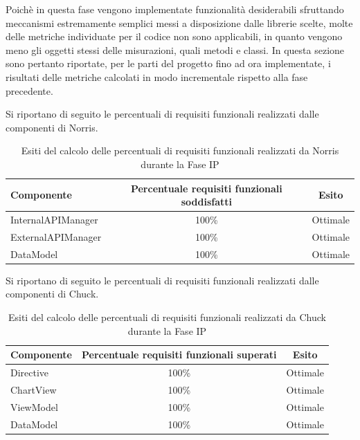 	Poichè in questa fase vengono implementate funzionalità desiderabili sfruttando meccanismi estremamente semplici messi a disposizione dalle librerie scelte, molte delle metriche individuate per il codice non sono applicabili, in quanto vengono meno gli oggetti stessi delle misurazioni, quali metodi e classi.
	In questa sezione sono pertanto riportate, per le parti del progetto fino ad ora implementate, i risultati delle metriche calcolati in modo incrementale rispetto alla fase precedente.\\

	Si riportano di seguito le percentuali di requisiti funzionali realizzati dalle componenti di Norris.
	\begin{table}[H]
		\centering
			\begin{tabu}{| l | c | c |}
				\hline
				Componente	& Percentuale requisiti funzionali soddisfatti	& Esito		\\ \hline \hline
				InternalAPIManager	& 100\% 	& Ottimale  \\ \hline
				ExternalAPIManager  & 	100\%	& Ottimale  \\ \hline
				DataModel  & 	100\%	& Ottimale  \\ \hline
			\end{tabu}
		\caption{Esiti del calcolo delle percentuali di requisiti funzionali realizzati da Norris durante la Fase IP}
	\end{table}

	Si riportano di seguito le percentuali di requisiti funzionali realizzati dalle componenti di Chuck.
	\begin{table}[H]
		\centering
			\begin{tabu}{| l | c | c |}
				\hline
				Componente	& Percentuale requisiti funzionali superati	& Esito		\\ \hline \hline
				Directive	& 100\% 	& Ottimale  \\ \hline
				ChartView  & 	100\%	& Ottimale  \\ \hline
				ViewModel  & 	100\%	& Ottimale  \\ \hline
				DataModel  & 	100\%	& Ottimale  \\ \hline
			\end{tabu}
		\caption{Esiti del calcolo delle percentuali di requisiti funzionali realizzati da Chuck durante la Fase IP}
	\end{table}

